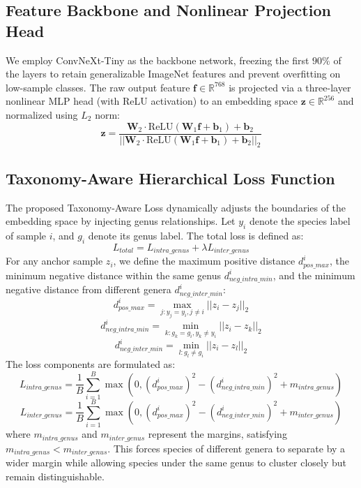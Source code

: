 \documentclass[journal,onecolumn]{IEEEtran}
\begin{document}
\subsection{Feature Backbone and Nonlinear Projection Head}
We employ ConvNeXt-Tiny as the backbone network, freezing the first $90\%$ of the layers to retain generalizable ImageNet features and prevent overfitting on low-sample classes. The raw output feature $\mathbf{f} \in \mathbb{R}^{768}$ is projected via a three-layer nonlinear MLP head (with ReLU activation) to an embedding space $\mathbf{z} \in \mathbb{R}^{256}$ and normalized using $L_2$ norm:
\begin{equation}
\mathbf{z} = \frac{\mathbf{W}_2 \cdot \text{ReLU}(\mathbf{W}_1 \mathbf{f} + \mathbf{b}_1) + \mathbf{b}_2}{||\mathbf{W}_2 \cdot \text{ReLU}(\mathbf{W}_1 \mathbf{f} + \mathbf{b}_1) + \mathbf{b}_2||_2}
\end{equation}

\subsection{Taxonomy-Aware Hierarchical Loss Function}
The proposed Taxonomy-Aware Loss dynamically adjusts the boundaries of the embedding space by injecting genus relationships. Let $y_i$ denote the species label of sample $i$, and $g_i$ denote its genus label. The total loss is defined as:
\begin{equation}
L_{total} = L_{intra\_genus} + \lambda L_{inter\_genus}
\end{equation}
For any anchor sample $z_i$, we define the maximum positive distance $d_{pos\_max}^i$, the minimum negative distance within the same genus $d_{neg\_intra\_min}^i$, and the minimum negative distance from different genera $d_{neg\_inter\_min}^i$:
\begin{equation}
d_{pos\_max}^i = \max_{j: y_j = y_i, j \neq i} ||z_i - z_j||_2
\end{equation}
\begin{equation}
d_{neg\_intra\_min}^i = \min_{k: g_k = g_i, y_k \neq y_i} ||z_i - z_k||_2
\end{equation}
\begin{equation}
d_{neg\_inter\_min}^i = \min_{l: g_l \neq g_i} ||z_i - z_l||_2
\end{equation}
The loss components are formulated as:
\begin{equation}
L_{intra\_genus} = \frac{1}{B} \sum_{i=1}^B \max\left(0, (d_{pos\_max}^i)^2 - (d_{neg\_intra\_min}^i)^2 + m_{intra\_genus}\right)
\end{equation}
\begin{equation}
L_{inter\_genus} = \frac{1}{B} \sum_{i=1}^B \max\left(0, (d_{pos\_max}^i)^2 - (d_{neg\_inter\_min}^i)^2 + m_{inter\_genus}\right)
\end{equation}
where $m_{intra\_genus}$ and $m_{inter\_genus}$ represent the margins, satisfying $m_{intra\_genus} < m_{inter\_genus}$. This forces species of different genera to separate by a wider margin while allowing species under the same genus to cluster closely but remain distinguishable.
\end{document}
